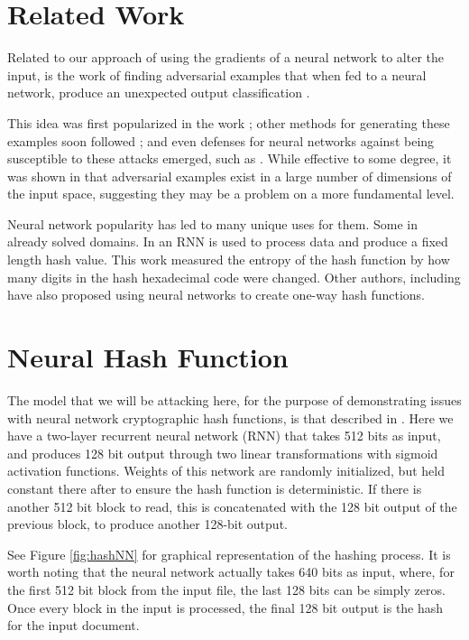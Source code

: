\documentclass{article}
\begin{document}
\section{Related Work}

Related to our approach of using the gradients of a neural network to alter
the input, is the work of finding adversarial examples that when fed to a
neural network, produce an unexpected output classification \cite{intriguing}.

This idea was first popularized in the work \cite{intriguing}; other methods
for generating these examples soon followed \cite{explaining}; and even defenses
for neural networks against being susceptible to these attacks emerged, such
as \cite{robust, ensemble, distil}. While effective to some degree, it was shown
in \cite{space} that adversarial examples exist in a large number of dimensions
of the input space, suggesting they may be a problem on a more fundamental 
level.

Neural network popularity has led to many unique uses for them. Some in already
solved domains. In \cite{hash1} an RNN is used to process data and produce
a fixed length hash value. This work measured the entropy of the hash function
by how many digits in the hash hexadecimal code were changed. Other authors,
including \cite{hash2} have also proposed using neural networks to create
one-way hash functions.

\section{Neural Hash Function}

The model that we will be attacking here, for the purpose of demonstrating
issues with neural network cryptographic hash functions, is that described in
\cite{hash1}.  Here we have a two-layer recurrent neural network (RNN) that
takes 512 bits as input, and produces 128 bit output through two linear
transformations with sigmoid activation functions. Weights of this network are
randomly initialized, but held constant there after to ensure the hash function
is deterministic. If there is another 512 bit block to read, this is
concatenated with the 128 bit output of the previous block, to produce another
128-bit output. 

See Figure \ref{fig:hashNN} for graphical representation of the hashing
process. It is worth noting that the neural network actually takes 640 bits
as input, where, for the first 512 bit block from the input file, the last
128 bits can be simply zeros. Once every block in the input is processed, the 
final 128 bit output is the hash for the input document.
\end{document}
